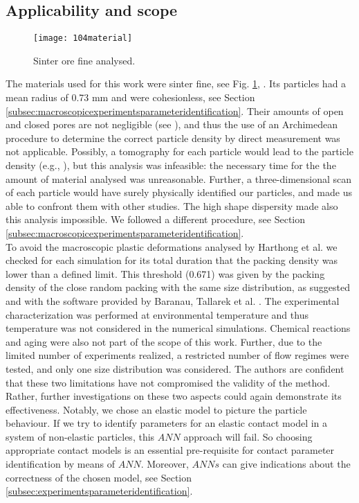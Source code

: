 


\subsection{Applicability and scope}
\label{subsec:applicability}

\begin{figure}[!htb] 
\centering 
\texttt{[image: 104material]} 
\caption[Sinter ore fine]{Sinter ore fine analysed.}
\label{fig:104material} 
\end{figure}


The materials used for this work were sinter fine, see Fig.
\ref{fig:104material}, 
. Its particles had a mean radius of 0.73 mm and were
cohesionless, see Section \ref{subsec:macroscopicexperimentsparameteridentification}.
Their amounts of open and closed pores are not negligible (see
\citet{RefWorks:191}), 
and thus the use of an Archimedean procedure to determine the correct particle density by direct measurement
was not applicable.
Possibly, a tomography for each particle would lead to the particle density
(e.g., \citet{RefWorks:77}), but this analysis was infeasible: 
the necessary time for the the amount of material
analysed was unreasonable. 
Further, a three-dimensional scan of each particle would have surely physically
identified our particles, and made us able to confront them with other studies. 
The high shape dispersity made also this analysis impossible. 
We followed a different procedure, see Section
\ref{subsec:macroscopicexperimentsparameteridentification}.\\
To avoid the macroscopic plastic deformations analysed by Harthong et al. \cite{RefWorks:183} 
we checked for each simulation for its total duration that the packing density was 
lower than a defined limit. 
This threshold (0.671) was given by the packing density of the close random packing with the 
same size distribution, as suggested and with the software provided by Baranau, Tallarek 
et al. \cite{RefWorks:182, RefWorks:185}.
The experimental characterization was performed at environmental temperature and thus 
temperature was not considered in the numerical simulations. Chemical reactions and aging 
were also not part of the scope of this work.
Further, due to the limited number of experiments realized, a restricted number
of flow regimes were tested, and only one size distribution was considered. 
The authors are confident that these two limitations have not compromised the validity of the method. 
Rather, further investigations on these two aspects could again demonstrate its effectiveness. 
Notably, we chose an elastic model to picture the particle behaviour. If we try
to identify parameters for an elastic contact model in a system of non-elastic particles, this $ANN$ approach will fail. 
So choosing appropriate contact models is an essential pre-requisite for contact 
parameter identification by means of $ANN$. 
Moreover, $ANNs$ can give indications about the correctness of the chosen model, 
see Section \ref{subsec:experimentsparameteridentification}.